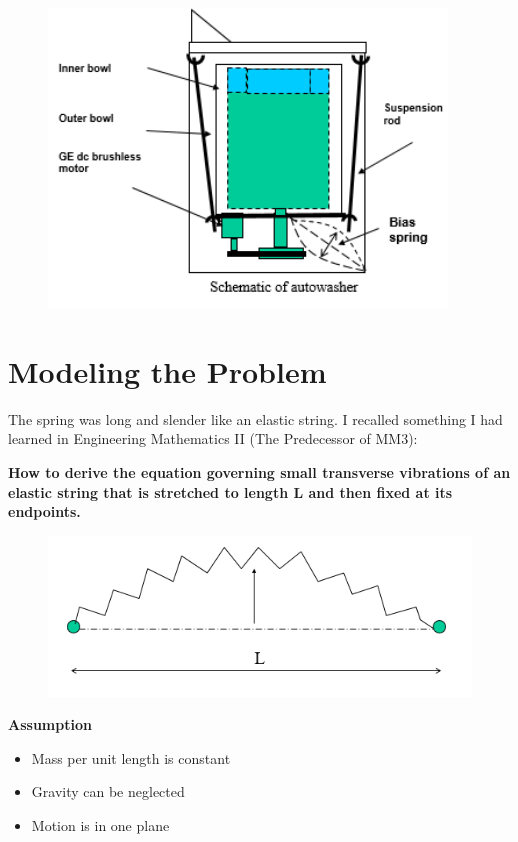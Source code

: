 \documentclass[12pt,a4paper]{article}
\begin{document}
	\begin{figure}[h]
		\begin{center}
			\includegraphics[width=400px]{wave0.PNG}
		\end{center}
	\end{figure}
	
\part{Modeling the Problem}

	The spring was long and slender like an elastic string. I recalled something I had learned in Engineering Mathematics II (The Predecessor of MM3):
	
	\textbf{How to derive the equation governing small transverse vibrations of an elastic string that is stretched to length L and then fixed at its endpoints.}
	\begin{figure}[h]
		\begin{center}
			\includegraphics{wave1.PNG}
		\end{center}
	\end{figure}
	
	\textbf{Assumption}
	\begin{itemize}
		\item Mass per unit length is constant
		\item Gravity can be neglected
		\item Motion is in one plane
	\end{itemize}
\end{document}
